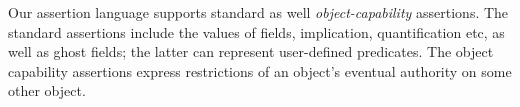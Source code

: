 

\label{sub:SpecO}


Our assertion language %
{supports} standard  as well \emph{object-capability} assertions. 
 The  standard assertions  include the values of fields, implication, quantification etc, as well as ghost fields; the latter can represent user-defined predicates. 
The  object capability assertions express restrictions of an object's eventual authority on some other object.
%




